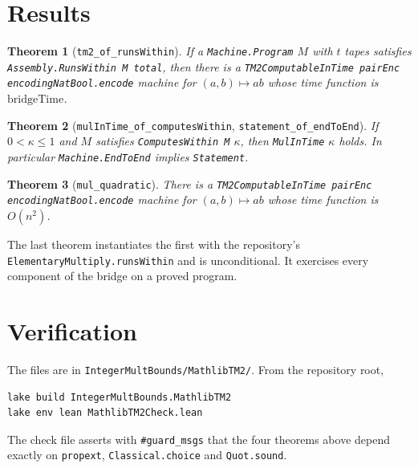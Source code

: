\documentclass[11pt]{amsart}
\newtheorem{theorem}{Theorem}
\theoremstyle{remark}
\begin{document}
\section{Results}

\begin{theorem}[\texttt{tm2\_of\_runsWithin}]
If a \texttt{Machine.Program} $M$ with $t$ tapes satisfies \texttt{Assembly.RunsWithin M total},
then there is a \texttt{TM2ComputableInTime pairEnc encodingNatBool.encode} machine for
$(a,b)\mapsto ab$ whose time function is $\mathrm{bridgeTime}$.
\end{theorem}

\begin{theorem}[\texttt{mulInTime\_of\_computesWithin}, \texttt{statement\_of\_endToEnd}]
If $0<\kappa\le1$ and $M$ satisfies \texttt{ComputesWithin M} $\kappa$, then
\texttt{MulInTime} $\kappa$ holds. In particular \texttt{Machine.EndToEnd} implies
\texttt{Statement}.
\end{theorem}

\begin{theorem}[\texttt{mul\_quadratic}]
There is a \texttt{TM2ComputableInTime pairEnc encodingNatBool.encode} machine for
$(a,b)\mapsto ab$ whose time function is $O(n^2)$.
\end{theorem}

The last theorem instantiates the first with the repository's
\texttt{ElementaryMultiply.runsWithin} and is unconditional. It exercises every component of the
bridge on a proved program.

\section{Verification}

The files are in \texttt{IntegerMultBounds/MathlibTM2/}. From the repository root,
\begin{lstlisting}
lake build IntegerMultBounds.MathlibTM2
lake env lean MathlibTM2Check.lean
\end{lstlisting}
The check file asserts with \verb|#guard_msgs| that the four theorems above depend exactly on
\texttt{propext}, \texttt{Classical.choice} and \texttt{Quot.sound}.
\end{document}
